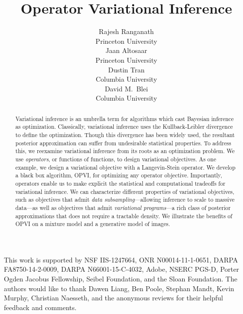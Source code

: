\documentclass{article}
\title{Operator Variational Inference}
\author{%
Rajesh Ranganath \\
Princeton University \\
\And
Jaan Altosaar \\
Princeton University\\
\And
Dustin Tran \\
Columbia University \\
\And
David M.~Blei \\
Columbia University
}
\begin{document}
\maketitle

\begin{abstract}
Variational inference is an umbrella term for algorithms which cast
Bayesian inference as optimization.
Classically, variational inference uses the Kullback-Leibler
divergence to define the optimization.
Though
this divergence has been widely used, the resultant posterior approximation
can suffer from undesirable statistical properties. To address this, we
reexamine
variational inference from its roots as an optimization problem. We use
\textit{operators}, or functions of functions, to design variational
objectives.
As one example,
we design a
variational objective
with a Langevin-Stein operator.
We develop
a black box algorithm, \gls{OPVI},
for optimizing any operator objective.
Importantly, operators enable us to make explicit the statistical and
computational tradeoffs for variational inference.
We can characterize different properties of variational objectives, such as
objectives that admit \emph{data
subsampling}---allowing inference to scale to massive data---as well as
objectives that admit
\emph{variational programs}---a rich class of posterior approximations that
does not require a tractable density.
We illustrate the benefits of \gls{OPVI} on a
mixture model and a generative model of images.
\end{abstract}








This work is supported by NSF IIS-1247664,  ONR
N00014-11-1-0651, DARPA FA8750-14-2-0009, DARPA
N66001-15-C-4032, Adobe, NSERC PGS-D, Porter Ogden Jacobus Fellowship,
Seibel Foundation, and the Sloan Foundation. The authors would
like to thank Dawen Liang, Ben Poole, Stephan Mandt, Kevin Murphy, Christian
Naesseth,
and the anonymous reviews for their helpful feedback and comments.


{\small

}
\end{document}
